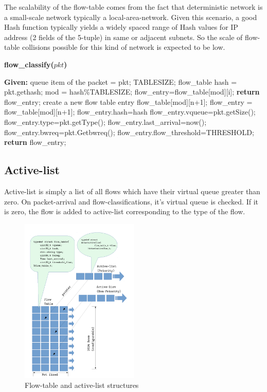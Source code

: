 \documentclass[10pt,sigconf,letterpaper,anonymous]{acmart}
\begin{document}
The scalability of the flow-table comes from the fact that deterministic network is a small-scale network typically a local-area-network. Given this scenario, a good Hash function typically yields a widely spaced range of Hash values for IP address (2 fields of the 5-tuple) in same or adjacent subnets. So the scale of flow-table collisions possible for this kind of network is expected to be low.

\begin{algorithm}
\caption{\textbf{flow\_classify($pkt$)}}
\label {algo:flowclassification}
\begin{algorithmic}[1]
\STATE \textbf{Given:} queue item of the packet = pkt; TABLESIZE; flow\_table
\STATE hash = pkt.gethash;
\STATE mod = hash\%TABLESIZE;
\STATE flow\_entry=flow\_table[mod][i];
\STATE \textbf{return} flow\_entry;
\ENDIF
\ENDFOR
\STATE create a new flow table entry flow\_table[mod][n+1];
\STATE flow\_entry = flow\_table[mod][n+1];
\STATE flow\_entry.hash=hash
\STATE flow\_entry.vqueue=pkt.getSize();
\STATE flow\_entry.type=pkt.getType();
\STATE flow\_entry.last\_arrival=now();
\STATE flow\_entry.bwreq=pkt.Getbwreq();
\STATE flow\_entry.flow\_threshold=THRESHOLD;
\STATE \textbf{return} flow\_entry;
\end{algorithmic}
\end{algorithm}

\subsection{Active-list}
Active-list is simply a list of all flows which have their virtual queue greater than zero. On packet-arrival and flow-classifications, it's virtual queue is checked. If it is zero, the flow is added to active-list corresponding to the type of the flow.


\begin{figure}[ht]
	\begin{center}
		\includegraphics[width=0.50\textwidth]{figures/flowtable.pdf}
		\caption{Flow-table and active-list structures}\label{fig:flowtable}
	\end{center}
\end{figure}
\end{document}
